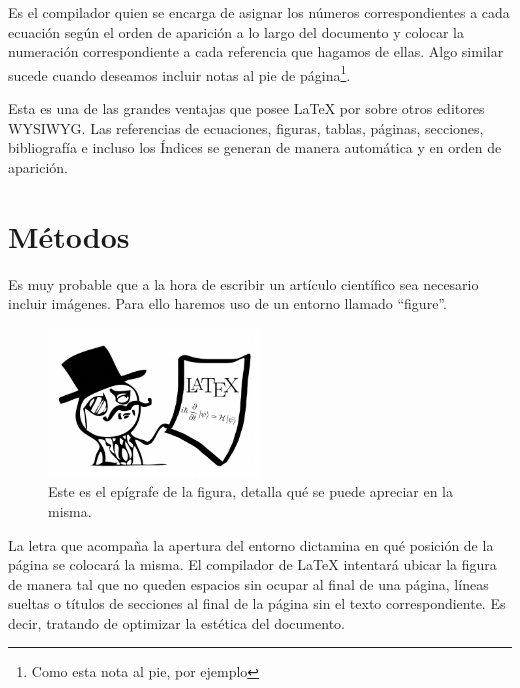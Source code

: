 \documentclass[a4paper,12pt]{article} %
\begin{document}
Es el compilador quien se encarga de asignar los números correspondientes a cada ecuación según el orden de aparición a lo largo del documento y colocar la numeración correspondiente a cada referencia que hagamos de ellas. Algo similar sucede cuando deseamos incluir notas al pie de página\footnote{Como esta nota al pie, por ejemplo}.

Esta es una de las grandes ventajas que posee {\LaTeX} por sobre otros editores WYSIWYG. Las referencias de ecuaciones, figuras, tablas, páginas, secciones, bibliografía e incluso los Índices se generan de manera automática y en orden de aparición.

\section{Métodos}
Es muy probable que a la hora de escribir un artículo científico sea necesario incluir imágenes. Para ello haremos uso de un entorno llamado ``figure''.

\begin{figure}[t] %
\centering %
\includegraphics[width=0.5\textwidth]{figs/latex.jpg}
\caption{Este es el epígrafe de la figura, detalla qué se puede apreciar en la misma.}
\label{fig:latex} %
\end{figure}

La letra que acompaña la apertura del entorno dictamina en qué posición de la página se colocará la misma. El compilador de {\LaTeX} intentará ubicar la figura de manera tal que no queden espacios sin ocupar al final de una página, líneas sueltas o títulos de secciones al final de la página sin el texto correspondiente. Es decir, tratando de optimizar la estética del documento.
\end{document}
